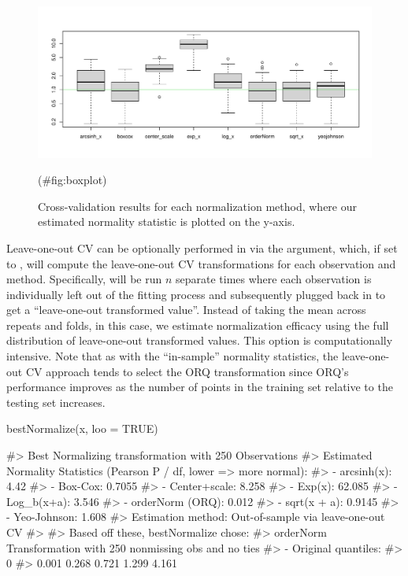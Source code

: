 \begin{Schunk}
\begin{figure}

{\centering \includegraphics[width=1\linewidth]{figs/boxplot-1} 

}

\caption[Cross-validation results for each normalization method, where our estimated normality statistic is plotted on the y-axis]{Cross-validation results for each normalization method, where our estimated normality statistic is plotted on the y-axis.}(\#fig:boxplot)
\end{figure}
\end{Schunk}

Leave-one-out CV can be optionally performed in  via
the  argument, which, if set to , will compute the
leave-one-out CV transformations for each observation and method.
Specifically,  will be run \(n\) separate times
where each observation is individually left out of the fitting process
and subsequently plugged back in to get a ``leave-one-out transformed
value''. Instead of taking the mean across repeats and folds, in this
case, we estimate normalization efficacy using the full distribution of
leave-one-out transformed values. This option is computationally
intensive. Note that as with the ``in-sample'' normality statistics, the
leave-one-out CV approach tends to select the ORQ transformation since
ORQ's performance improves as the number of points in the training set
relative to the testing set increases.

\begin{Schunk}
\begin{Sinput}
bestNormalize(x, loo = TRUE)
\end{Sinput}
\begin{Soutput}
#> Best Normalizing transformation with 250 Observations
#>  Estimated Normality Statistics (Pearson P / df, lower => more normal):
#>  - arcsinh(x): 4.42
#>  - Box-Cox: 0.7055
#>  - Center+scale: 8.258
#>  - Exp(x): 62.085
#>  - Log_b(x+a): 3.546
#>  - orderNorm (ORQ): 0.012
#>  - sqrt(x + a): 0.9145
#>  - Yeo-Johnson: 1.608
#> Estimation method: Out-of-sample via leave-one-out CV
#>  
#> Based off these, bestNormalize chose:
#> orderNorm Transformation with 250 nonmissing obs and no ties 
#>  - Original quantiles:
#>    0%
#> 0.001 0.268 0.721 1.299 4.161
\end{Soutput}
\end{Schunk}

